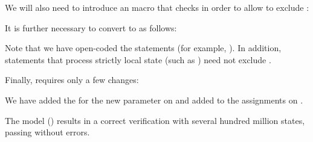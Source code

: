 

We will also need to introduce an 
macro that checks  in order to allow
 to exclude :



It is further necessary to convert 
to  as follows:



\begin{fcvref}
Note that we have open-coded the  statements
(for example, ).
In addition, statements that process strictly local state
(such as ) need not exclude .
\end{fcvref}

Finally,  requires only a few changes:



\begin{fcvref}
We have added the  for the new
 parameter on  and
added  to the 
assignments on .
\end{fcvref}

The model ()
results in a correct verification with several hundred million
states, passing without errors.

